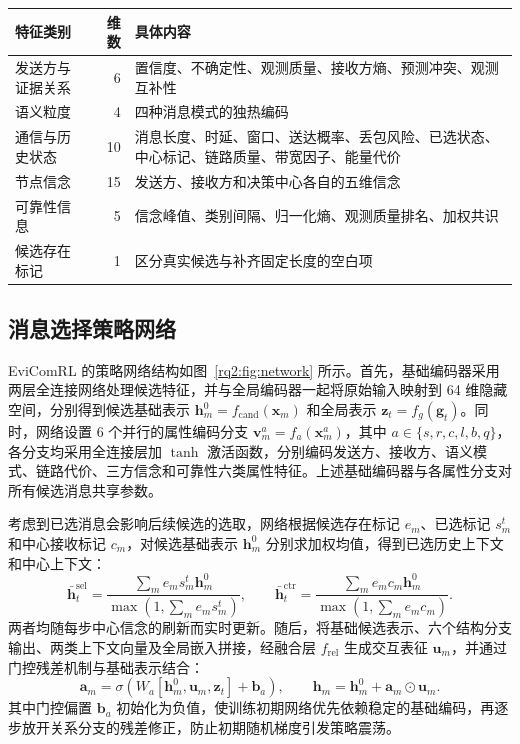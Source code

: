 \begin{table}[htbp]
\centering
{}
\label{rq2:tab:features}
\small
\setlength{\tabcolsep}{5pt}
\renewcommand{\arraystretch}{0.92}
\begin{tabularx}{\textwidth}{l r X}
\toprule
特征类别 & 维数 & 具体内容\\
\midrule
发送方与证据关系 & 6 & 置信度、不确定性、观测质量、接收方熵、预测冲突、观测互补性\\
语义粒度 & 4 & 四种消息模式的独热编码\\
通信与历史状态 & 10 & 消息长度、时延、窗口、送达概率、丢包风险、已选状态、中心标记、链路质量、带宽因子、能量代价\\
节点信念 & 15 & 发送方、接收方和决策中心各自的五维信念\\
可靠性信息 & 5 & 信念峰值、类别间隔、归一化熵、观测质量排名、加权共识\\
候选存在标记 & 1 & 区分真实候选与补齐固定长度的空白项\\
\bottomrule
\end{tabularx}
\end{table}

\subsection{消息选择策略网络}

EviComRL 的策略网络结构如图~\ref{rq2:fig:network} 所示。首先，基础编码器采用两层全连接网络处理候选特征，并与全局编码器一起将原始输入映射到 64 维隐藏空间，分别得到候选基础表示 $\bm h_m^0=f_{\mathrm{cand}}(\bm x_m)$ 和全局表示 $\bm z_t=f_g(\bm g_t)$。同时，网络设置 6 个并行的属性编码分支 $\bm v_m^a=f_a(\bm x_m^a)$，其中 $a\in\{s,r,c,l,b,q\}$，各分支均采用全连接层加 $\tanh$ 激活函数，分别编码发送方、接收方、语义模式、链路代价、三方信念和可靠性六类属性特征。上述基础编码器与各属性分支对所有候选消息共享参数。

考虑到已选消息会影响后续候选的选取，网络根据候选存在标记 $e_m$、已选标记 $s_m^t$ 和中心接收标记 $c_m$，对候选基础表示 $\bm h_m^0$ 分别求加权均值，得到已选历史上下文和中心上下文：
\begin{equation}
\bar{\bm h}_t^{\mathrm{sel}}=
\frac{\sum_m e_ms_m^t\bm h_m^0}{\max(1,\sum_m e_ms_m^t)},\qquad
\bar{\bm h}_t^{\mathrm{ctr}}=
\frac{\sum_m e_mc_m\bm h_m^0}{\max(1,\sum_m e_mc_m)}.
\label{rq2:eq:history}
\end{equation}
两者均随每步中心信念的刷新而实时更新。随后，将基础候选表示、六个结构分支输出、两类上下文向量及全局嵌入拼接，经融合层 $f_{\mathrm{rel}}$ 生成交互表征 $\bm u_m$，并通过门控残差机制与基础表示结合：
\begin{equation}
\bm a_m=\sigma\!\left(W_a[\bm h_m^0,\bm u_m,\bm z_t]+\bm b_a\right),\qquad
\bm h_m=\bm h_m^0+\bm a_m\odot\bm u_m.
\label{rq2:eq:gate}
\end{equation}
其中门控偏置 $\bm b_a$ 初始化为负值，使训练初期网络优先依赖稳定的基础编码，再逐步放开关系分支的残差修正，防止初期随机梯度引发策略震荡。

